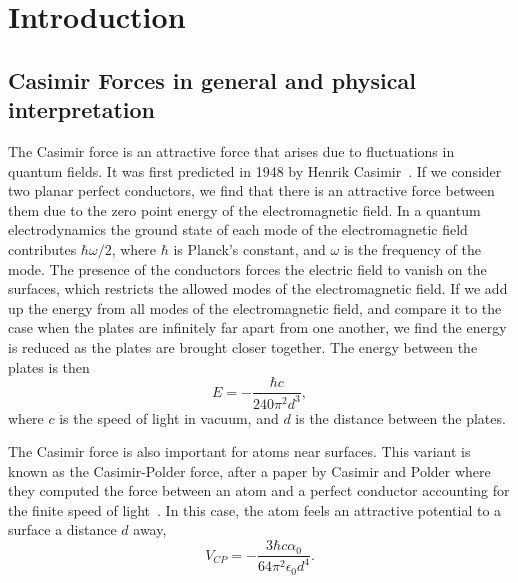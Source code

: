 \chapter{Introduction}



\section{Casimir Forces in general and physical interpretation}

The Casimir force is an attractive force that arises due to fluctuations in quantum fields.  It was first predicted in 1948 by Henrik Casimir~\cite{Casimir1948}.  If we consider two planar perfect conductors, we find that there is an attractive force between them due to the zero point energy of the electromagnetic field.  In a quantum electrodynamics the ground state of each mode of the electromagnetic field contributes $\hbar\omega/2$, where $\hbar$ is Planck's constant, and $\omega$ is the frequency of the mode.  The presence of the conductors forces the electric field to vanish on the surfaces, which restricts the allowed modes of the electromagnetic field. If we add up the energy from all modes of the electromagnetic field, and compare it to the case when the plates are infinitely far apart from one another, we find the energy is reduced as the plates are brought closer together.  The energy between the plates is then
\begin{equation}
  E = -\frac{\hbar c}{240\pi^2 d^3},
\end{equation}
where $c$ is the speed of light in vacuum, and $d$ is the distance between the plates.


The Casimir force is also important for atoms near surfaces.  This variant is known as the Casimir-Polder force, after a paper by Casimir and Polder where they computed the force between an atom and a perfect conductor accounting for the finite speed of light~\cite{CasimirPolder1948}.  
In this case, the atom feels an attractive potential to a surface a distance $d$ away,
\begin{equation}
V_{CP} =-\frac{3\hbar c\alpha_0}{64\pi^2\epsilon_0 d^4}.
\end{equation}

